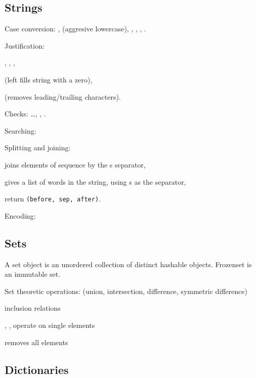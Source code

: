 \subsection{Strings}
\begin{compactenum}
\item Case conversion: 
, 
 (aggresive lowercase), 
, 
, 
, 
.

\item Justification: 
\begin{compactenum}
	\item {},
		  ,
	      ,

	\item {} 
	(left fills string with a zero),

	\item {} 
	(removes leading/trailing characters).
\end{compactenum}

\item Checks:
\ldots,
, 
.

\item Searching:

\item Splitting and joining:
\begin{compactenum}
	\item {} joins elements of sequence by the s separator,
	\item {} gives a list of words in the string, using s as the separator,
	\item {} return \texttt{(before, sep, after)}.
\end{compactenum}

\item Encoding: 
\end{compactenum}

 \subsection{Sets}                                                               
 A set object is an unordered collection of distinct hashable objects.   
 Frozenset is an immutable set.
 \begin{compactenum}                                                                   
 \item Set theoretic operations: \python{| \& - \^}                              
   (union, intersection, difference, symmetric difference)                       
 \item \python{< <= > >=} inclusion relations                                    
 \item {}, ,  operate on single elements
 \item {} removes all elements                                       
 \end{compactenum}

\subsection{Dictionaries}
